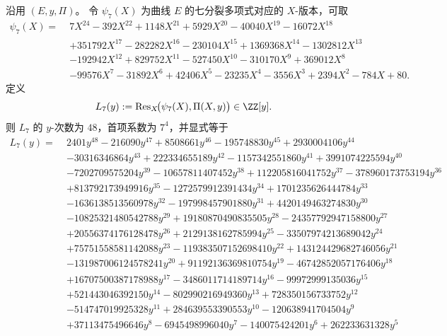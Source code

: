 \begin{theorem}\label{thm:xi-leyang-image-seven-torsion-elimination-irreducibility-discriminant}
沿用 \((E,y,\Pi)\)。
令 \(\psi_7(X)\) 为曲线 \(E\) 的七分裂多项式对应的 \(X\)-版本，可取
\[
\begin{aligned}
\psi_7(X)=\;&7X^{24}-392X^{22}+1148X^{21}+5929X^{20}-40040X^{19}-16072X^{18}\\
&+351792X^{17}-282282X^{16}-230104X^{15}+1369368X^{14}-1302812X^{13}\\
&-192942X^{12}+829752X^{11}-527450X^{10}-310170X^9+369012X^8\\
&-99576X^7-31892X^6+42406X^5-23235X^4-3556X^3+2394X^2-784X+80.
\end{aligned}
\]
定义
\[
L_7(y):=\operatorname{Res}_X\!\bigl(\psi_7(X),\Pi(X,y)\bigr)\in\ZZ[y].
\]
则 \(L_7\) 的 \(y\)-次数为 \(48\)，首项系数为 \(7^4\)，并显式等于
\[
\begin{aligned}
L_7(y)=\;&2401y^{48}-216090y^{47}+8508661y^{46}-195748830y^{45}+2930004106y^{44}\\
&-30316346864y^{43}+222334655189y^{42}-1157342551860y^{41}+3991074225594y^{40}\\
&-7202709575204y^{39}-10657811407452y^{38}+112205816041752y^{37}-378960173753194y^{36}\\
&+813792173949916y^{35}-1272579912391434y^{34}+1701235626444784y^{33}\\
&-1636138513560978y^{32}-197998457901880y^{31}+4420149463274830y^{30}\\
&-10825321480542788y^{29}+19180870490835505y^{28}-24357792947158800y^{27}\\
&+20556374176128478y^{26}+2129138162785994y^{25}-33507974213689042y^{24}\\
&+75751558581142088y^{23}-119383507152698410y^{22}+143124429682746056y^{21}\\
&-131987006124578241y^{20}+91192136369810754y^{19}-46742852057176406y^{18}\\
&+16707500387178988y^{17}-3486011714189714y^{16}-99972999135036y^{15}\\
&+521443046392150y^{14}-802990216949360y^{13}+728350156733752y^{12}\\
&-514747019925328y^{11}+284639553390553y^{10}-120638941704504y^9\\
&+37113475496646y^8-6945498996040y^7-140075424201y^6+262233631328y^5\\

\end{aligned}\]
\end{theorem}
